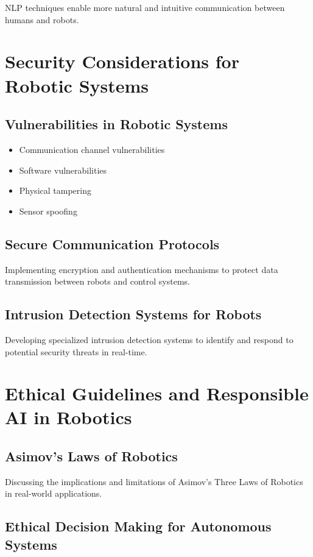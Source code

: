 \documentclass[
]{article}
\begin{document}
NLP techniques enable more natural and intuitive communication between
humans and robots.

\section{Security Considerations for Robotic Systems}

\subsection{Vulnerabilities in Robotic Systems}
\begin{itemize}
    \item Communication channel vulnerabilities
    \item Software vulnerabilities
    \item Physical tampering
    \item Sensor spoofing
\end{itemize}

\subsection{Secure Communication Protocols}

Implementing encryption and authentication mechanisms to protect data
transmission between robots and control systems.

\subsection{Intrusion Detection Systems for Robots}

Developing specialized intrusion detection systems to identify and
respond to potential security threats in real-time.

\section{Ethical Guidelines and Responsible AI in Robotics}

\subsection{Asimov's Laws of Robotics}

Discussing the implications and limitations of Asimov's Three Laws of
Robotics in real-world applications.

\subsection{Ethical Decision Making for Autonomous Systems}
\end{document}
